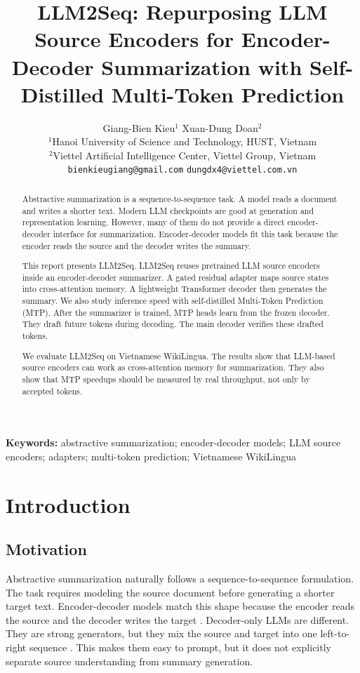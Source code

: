 \documentclass[11pt]{article}
\title{LLM2Seq: Repurposing LLM Source Encoders for Encoder-Decoder Summarization with Self-Distilled Multi-Token Prediction}
\author{
  Giang-Bien Kieu$^1$ \quad Xuan-Dung Doan$^2$ \\
  $^1$Hanoi University of Science and Technology, HUST, Vietnam \\
  $^2$Viettel Artificial Intelligence Center, Viettel Group, Vietnam \\
  \texttt{bienkieugiang@gmail.com} \quad \texttt{dungdx4@viettel.com.vn}
}
\begin{document}
\maketitle

\begin{abstract}
Abstractive summarization is a sequence-to-sequence task.
A model reads a document and writes a shorter text.
Modern LLM checkpoints are good at generation and representation learning.
However, many of them do not provide a direct encoder-decoder interface for summarization.
Encoder-decoder models fit this task because the encoder reads the source and the decoder writes the summary.

This report presents LLM2Seq.
LLM2Seq reuses pretrained LLM source encoders inside an encoder-decoder summarizer.
A gated residual adapter maps source states into cross-attention memory.
A lightweight Transformer decoder then generates the summary.
We also study inference speed with self-distilled Multi-Token Prediction (MTP).
After the summarizer is trained, MTP heads learn from the frozen decoder.
They draft future tokens during decoding.
The main decoder verifies these drafted tokens.

We evaluate LLM2Seq on Vietnamese WikiLingua.
The results show that LLM-based source encoders can work as cross-attention memory for summarization.
They also show that MTP speedups should be measured by real throughput, not only by accepted tokens.
\end{abstract}

\noindent\textbf{Keywords:} abstractive summarization; encoder-decoder models; LLM source encoders; adapters; multi-token prediction; Vietnamese WikiLingua

\section{Introduction}
\label{sec:introduction}

\subsection{Motivation}

Abstractive summarization naturally follows a sequence-to-sequence formulation.
The task requires modeling the source document before generating a shorter target text.
Encoder-decoder models match this shape because the encoder reads the source and the decoder writes the target \citep{sutskever2014sequence,bahdanau2015neural,vaswani2017attention}.
Decoder-only LLMs are different.
They are strong generators, but they mix the source and target into one left-to-right sequence \citep{brown2020language,dubey2024llama3,yang2024qwen2}.
This makes them easy to prompt, but it does not explicitly separate source understanding from summary generation.
\end{document}
